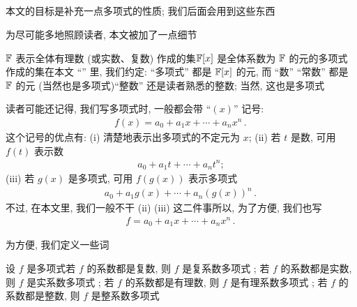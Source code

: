 \subsection*{\SomePropertiesOfPolynomials}
\markright{\SomePropertiesOfPolynomials}

本文的目标是补充一点多项式的性质; 我们后面会用到这些东西\period

为尽可能多地照顾读者, 本文被加了一点细节\period

$\mathbb{F}$ 表示全体有理数 (或实数、复数) 作成的集\period $\mathbb{F}[x]$ 是全体系数为 $\mathbb{F}$ 的元的多项式作成的集\period 在本文 ``\SomePropertiesOfPolynomials '' 里, 我们约定: ``多项式'' 都是 $\mathbb{F}[x]$ 的元, 而 ``数'' ``常数'' 都是 $\mathbb{F}$ 的元 (当然也是多项式)\period ``整数'' 还是读者熟悉的整数; 当然, 这也是多项式\period

读者可能还记得, 我们写多项式时, 一般都会带 ``$(x)$'' 记号:
\begin{align*}
    f(x) = a_0 + a_1 x + \cdots + a_n x^n \period
\end{align*}
这个记号的优点有: (i) 清楚地表示出多项式的不定元为 $x$; (ii) 若 $t$ 是数, 可用 $f(t)$ 表示数
\begin{align*}
    a_0 + a_1 t + \cdots + a_n t^n;
\end{align*}
(iii) 若 $g(x)$ 是多项式, 可用 $f(g(x))$ 表示多项式
\begin{align*}
    a_0 + a_1 g(x) + \cdots + a_n (g(x))^n \period
\end{align*}
不过, 在本文里, 我们一般不干 (ii) (iii) 这二件事\period 所以, 为了方便, 我们也写
\begin{align*}
    f = a_0 + a_1 x + \cdots + a_n x^n \period
\end{align*}

为方便, 我们定义一些词\period

\begin{definition}
    设 $f$ 是多项式\period 若 $f$ 的系数都是复数, 则 $f$ 是复系数多项式 ; 若 $f$ 的系数都是实数, 则 $f$ 是实系数多项式 ; 若 $f$ 的系数都是有理数, 则 $f$ 是有理系数多项式 ; 若 $f$ 的系数都是整数, 则 $f$ 是整系数多项式 \period
\end{definition}

